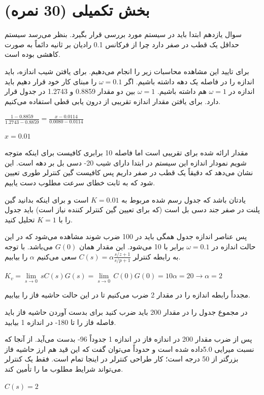 \documentclass{article}
\begin{document}
\raggedleft
\section{ بخش تکمیلی (30 نمره)}

\begin{problem}{سوال یازدهم}
	ابتدا باید  در سیستم مورد بررسی قرار بگیرد. بنظر می‌رسد سیستم حداقل یک قطب در صفر دارد چرا از فرکانس 0.1 رادیان بر ثانیه دائماً به صورت کاهشی بوده است.
	
	برای تایید این مشاهده محاسبات زیر را انجام می‌دهیم. برای یافتن شیب اندازه، باید اندازه را در فاصله یک دهه داشته باشیم. اگر 
	$\omega = 0.1$
	را مبنای کار خود قرار دهیم باید اندازه در 
	$\omega = 1$
	هم داشته باشیم.
	$\omega = 1$
	بین دو مقدار 0.8859 و 1.2743 در جدول قرار دارد. برای یافتن مقدار اندازه تقریبی از درون یابی قطی استفاده می‌کنیم.
	
	\raggedleft
	$\frac{1-0.8859}{1.2743-0.8859} = \frac{x - 0.0114}{0.0080 - 0.0114}$
	
	$x = 0.01$
	
	\raggedright

مقدار ارائه شده برای  تقریبی است اما فاصله 10 برابری کافیست برای اینکه متوجه شویم نمودار اندازه این سیستم در ابتدا دارای شیب 20- دسی بل بر دهه است. این نشان می‌دهد که دقیقاً یک قطب  در صفر داریم پس کافیست گین کنترلر طوری تعیین شود که به ثابت خطای سرعت مطلوب دست یابیم.

یادتان باشد که جدول رسم شده مربوط به
$K = 0.01$
است و برای اینکه بدانید گین پلنت در صفر جند دسی بل است (که برای تعیین گین کنترلر کننده نیاز است) باید جدول را با 
$K=1$
تحلیل کنید.

پس عناصر اندازه جدول همگی باید در 100 ضرب شوند مشاهده می‌شود که در این حالت اندازه در 
$\omega = 0.1$
برابر با 10 می‌شود. این مقدار همان
$G(0)$
می‌باشد.
با توجه به رابطه کنترلر
$C(s)=\alpha\frac{s/z+1}{s/p+1}$
سعی می‌کنیم 
$\alpha$
را بیابیم.

\raggedleft
${{K}_{v}}=\underset{s\to 0}{\mathop{\lim }}\,sC(s)G(s)=\underset{s\to 0}{\mathop{\lim }}\,C(0)G(0)=10\alpha =20\to \alpha =2$

\raggedright
مجدداً رابطه اندازه را در مقدار 2 ضرب می‌کنیم تا در این حالت حاشیه فاز را بیابیم.
 
 در مجموع جدول را در مقدار 200 باید ضرب کنید برای بدست آوردن حاشیه فاز باید فاصله فاز را تا 180- در اندازه 1 بیابید.
 
 پس از ضرب مقدار 200 در اندازه فاز در اندازه 1 جدوداً 96- بدست می‌آید. از آنجا که نسبت میرایی 5.0داده شده است و حدوداً می‌توان گفت که این قید هم ارز حاشیه فاز بزرگتر از 50 درجه است؛ کار طراحی کنترلر در اینجا تمام است. فقط یک کنترلر می‌تواند شرایط مطلوب ما را تأمین کند.
 
 \raggedleft
 $C(s) = 2$
 
 \raggedright
\end{problem}
\end{document}
